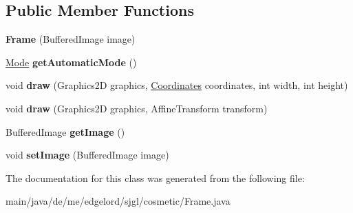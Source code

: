 \subsection*{Public Member Functions}
\begin{DoxyCompactItemize}
\item 
\mbox{\label{classde_1_1me_1_1edgelord_1_1sjgl_1_1cosmetic_1_1_frame_afd7a9f22401ee944a01af1b41c35562b}} 
{\bfseries Frame} (Buffered\+Image image)
\item 
\mbox{\label{classde_1_1me_1_1edgelord_1_1sjgl_1_1cosmetic_1_1_frame_af07633cca1935cefc584c4f011f15542}} 
\mbox{\hyperlink{enumde_1_1me_1_1edgelord_1_1sjgl_1_1cosmetic_1_1_frame_1_1_mode}{Mode}} {\bfseries get\+Automatic\+Mode} ()
\item 
\mbox{\label{classde_1_1me_1_1edgelord_1_1sjgl_1_1cosmetic_1_1_frame_ad2ef6b96113ea5e04711b36b4a164bc4}} 
void {\bfseries draw} (Graphics2D graphics, \mbox{\hyperlink{classde_1_1me_1_1edgelord_1_1sjgl_1_1location_1_1_coordinates}{Coordinates}} coordinates, int width, int height)
\item 
\mbox{\label{classde_1_1me_1_1edgelord_1_1sjgl_1_1cosmetic_1_1_frame_aa673664cc38925144f634f336c9cb08d}} 
void {\bfseries draw} (Graphics2D graphics, Affine\+Transform transform)
\item 
\mbox{\label{classde_1_1me_1_1edgelord_1_1sjgl_1_1cosmetic_1_1_frame_a5b1179bdc0fcbf68b22e28df9d208f20}} 
Buffered\+Image {\bfseries get\+Image} ()
\item 
\mbox{\label{classde_1_1me_1_1edgelord_1_1sjgl_1_1cosmetic_1_1_frame_a932c750c8a7478c1b50d1327d0f28793}} 
void {\bfseries set\+Image} (Buffered\+Image image)
\end{DoxyCompactItemize}


The documentation for this class was generated from the following file\+:\begin{DoxyCompactItemize}
\item 
main/java/de/me/edgelord/sjgl/cosmetic/Frame.\+java\end{DoxyCompactItemize}
